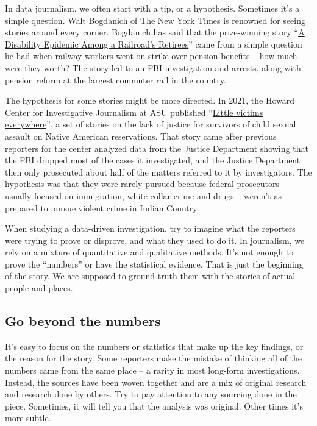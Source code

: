 \documentclass[
  letterpaper,
  DIV=11,
  numbers=noendperiod]{scrreprt}
\begin{document}
In data journalism, we often start with a tip, or a hypothesis.
Sometimes it's a simple question. Walt Bogdanich of The New York Times
is renowned for seeing stories around every corner. Bogdanich has said
that the prize-winning story
``\href{https://www.nytimes.com/2008/09/21/nyregion/21lirr.html}{A
Disability Epidemic Among a Railroad's Retirees}'' came from a simple
question he had when railway workers went on strike over pension
benefits -- how much were they worth? The story led to an FBI
investigation and arrests, along with pension reform at the largest
commuter rail in the country.

The hypothesis for some stories might be more directed. In 2021, the
Howard Center for Investigative Journalism at ASU published
``\href{https://cronkitenews.azpbs.org/littlevictims/little-victims-everywhere/chapter-1.html}{Little
victims everywhere}'', a set of stories on the lack of justice for
survivors of child sexual assault on Native American reservations. That
story came after previous reporters for the center analyzed data from
the Justice Department showing that the FBI dropped most of the cases it
investigated, and the Justice Department then only prosecuted about half
of the matters referred to it by investigators. The hypothesis was that
they were rarely pursued because federal prosecutors -- usually focused
on immigration, white collar crime and drugs -- weren't as prepared to
pursue violent crime in Indian Country.

When studying a data-driven investigation, try to imagine what the
reporters were trying to prove or disprove, and what they used to do it.
In journalism, we rely on a mixture of quantitative and qualitative
methods. It's not enough to prove the ``numbers'' or have the
statistical evidence. That is just the beginning of the story. We are
supposed to ground-truth them with the stories of actual people and
places.

\hypertarget{go-beyond-the-numbers}{%
\subsection*{Go beyond the numbers}\label{go-beyond-the-numbers}}

It's easy to focus on the numbers or statistics that make up the key
findings, or the reason for the story. Some reporters make the mistake
of thinking all of the numbers came from the same place -- a rarity in
most long-form investigations. Instead, the sources have been woven
together and are a mix of original research and research done by others.
Try to pay attention to any sourcing done in the piece. Sometimes, it
will tell you that the analysis was original. Other times it's more
subtle.
\end{document}
